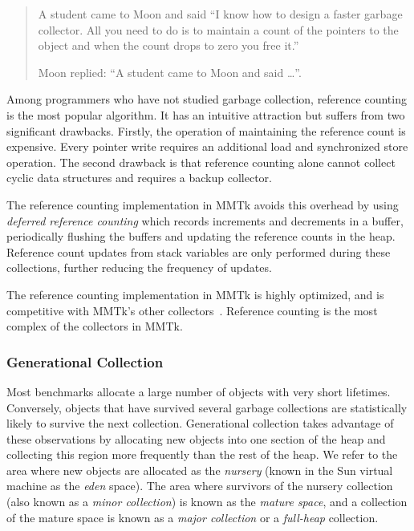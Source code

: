 \begin{quotation}
A student came to Moon and said ``I know how to design a faster garbage collector.
All you need to do is to maintain a count of the pointers to the object and when the
count drops to zero you free it.''  

Moon replied: ``A student came to Moon and said \ldots''.
\end{quotation}

Among programmers who have not studied garbage collection, reference counting is the most
popular algorithm.  It has an intuitive attraction but suffers from two significant drawbacks.
Firstly, the operation of maintaining the reference count is expensive.  Every pointer write
requires an additional load and synchronized store operation.  The second drawback
is that reference counting alone cannot collect cyclic data structures and requires
a backup collector.

The reference counting implementation in MMTk avoids this overhead by using
\emph{deferred reference counting} which records increments and decrements
in a buffer, periodically flushing the buffers and updating the reference counts
in the heap.  Reference count updates from stack variables are only performed
during these collections, further reducing the frequency of updates.

The reference counting implementation in MMTk is highly optimized, and is
competitive with MMTk's other collectors~\citep{SBF:12}.  Reference counting
is the most complex of the collectors in MMTk.

\subsubsection{Generational Collection}

Most benchmarks allocate a large number of objects with very short lifetimes.
Conversely, objects that have survived several garbage collections are statistically
likely to survive the next collection.  Generational collection takes advantage of
these observations by allocating new objects into one section of the heap and
collecting this region more frequently than the rest of the heap.  We refer to
the area where new objects are allocated as the \emph{nursery} (known in the Sun
virtual machine as the \emph{eden} space).  The area where survivors of the
nursery collection (also known as a \emph{minor collection}) is known as
the \emph{mature space}, and a collection of the mature space is known as
a \emph{major collection} or a \emph{full-heap} collection.


